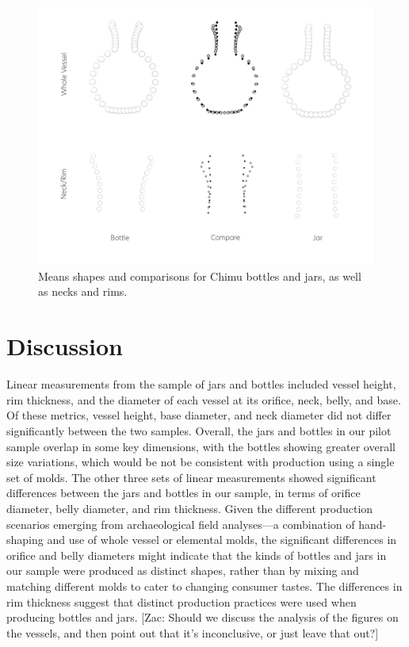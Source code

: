 \documentclass[]{interact}
\theoremstyle{plain}%
\theoremstyle{definition}
\theoremstyle{remark}
\begin{document}
\begin{figure}\centering
\includegraphics[width=\linewidth]{figs/mshape.compare.png}
\caption{Means shapes and comparisons for Chimu bottles and jars, as well as necks and rims. }
\label{fig:mshape}
\end{figure}

\hypertarget{discussion}{%
\section{Discussion}\label{discussion}}

Linear measurements from the sample of jars and bottles included vessel
height, rim thickness, and the diameter of each vessel at its orifice,
neck, belly, and base. Of these metrics, vessel height, base diameter,
and neck diameter did not differ significantly between the two samples.
Overall, the jars and bottles in our pilot sample overlap in some key
dimensions, with the bottles showing greater overall size variations,
which would be not be consistent with production using a single set of
molds. The other three sets of linear measurements showed significant
differences between the jars and bottles in our sample, in terms of
orifice diameter, belly diameter, and rim thickness. Given the different
production scenarios emerging from archaeological field analyses---a
combination of hand-shaping and use of whole vessel or elemental molds,
the significant differences in orifice and belly diameters might
indicate that the kinds of bottles and jars in our sample were produced
as distinct shapes, rather than by mixing and matching different molds
to cater to changing consumer tastes. The differences in rim thickness
suggest that distinct production practices were used when producing
bottles and jars. {[}Zac: Should we discuss the analysis of the figures
on the vessels, and then point out that it's inconclusive, or just leave
that out?{]}
\end{document}
